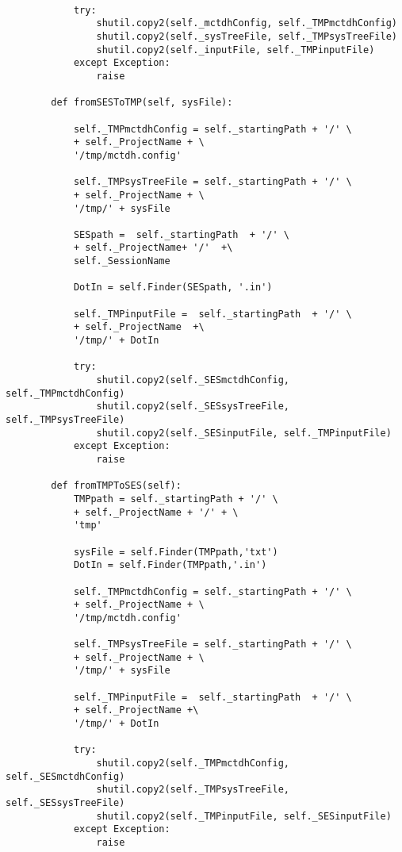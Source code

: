 \begin{verbatim}
    
            try:
                shutil.copy2(self._mctdhConfig, self._TMPmctdhConfig) 
                shutil.copy2(self._sysTreeFile, self._TMPsysTreeFile)
                shutil.copy2(self._inputFile, self._TMPinputFile)
            except Exception:
                raise
    
        def fromSESToTMP(self, sysFile):    
    
            self._TMPmctdhConfig = self._startingPath + '/' \
            + self._ProjectName + \
            '/tmp/mctdh.config'
    
            self._TMPsysTreeFile = self._startingPath + '/' \
            + self._ProjectName + \
            '/tmp/' + sysFile
    
            SESpath =  self._startingPath  + '/' \
            + self._ProjectName+ '/'  +\
            self._SessionName
    
            DotIn = self.Finder(SESpath, '.in')
    
            self._TMPinputFile =  self._startingPath  + '/' \
            + self._ProjectName  +\
            '/tmp/' + DotIn
    
            try:
                shutil.copy2(self._SESmctdhConfig, self._TMPmctdhConfig) 
                shutil.copy2(self._SESsysTreeFile, self._TMPsysTreeFile)
                shutil.copy2(self._SESinputFile, self._TMPinputFile)
            except Exception:
                raise
    
        def fromTMPToSES(self):    
            TMPpath = self._startingPath + '/' \
            + self._ProjectName + '/' + \
            'tmp'
    
            sysFile = self.Finder(TMPpath,'txt')
            DotIn = self.Finder(TMPpath,'.in')
    
            self._TMPmctdhConfig = self._startingPath + '/' \
            + self._ProjectName + \
            '/tmp/mctdh.config'
    
            self._TMPsysTreeFile = self._startingPath + '/' \
            + self._ProjectName + \
            '/tmp/' + sysFile
    
            self._TMPinputFile =  self._startingPath  + '/' \
            + self._ProjectName +\
            '/tmp/' + DotIn
    
            try:
                shutil.copy2(self._TMPmctdhConfig, self._SESmctdhConfig) 
                shutil.copy2(self._TMPsysTreeFile, self._SESsysTreeFile)
                shutil.copy2(self._TMPinputFile, self._SESinputFile)
            except Exception:
                raise
            

\end{verbatim}
